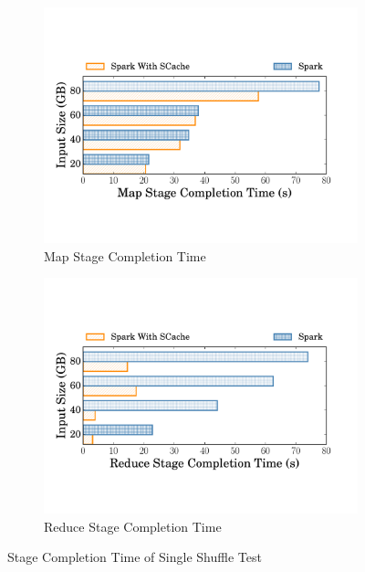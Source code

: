 \begin{figure}
	\centering
	\begin{minipage}[t]{.5\textwidth}
	\begin{subfigure}{.5\linewidth}
		\includegraphics[width=\linewidth]{fig/groupbymapstage}
		\caption{Map Stage Completion Time}
		\label{fig:mapstage}
	\end{subfigure}
	\begin{subfigure}{.49\linewidth}
		\includegraphics[width=\linewidth]{fig/groupbyreducestage}
		\caption{Reduce Stage Completion Time}
		\label{fig:reducestage}	
	\end{subfigure}
	\caption{Stage Completion Time of Single Shuffle Test}
	\label{fig:singleshuffle}
	\end{minipage}	

\end{figure}
